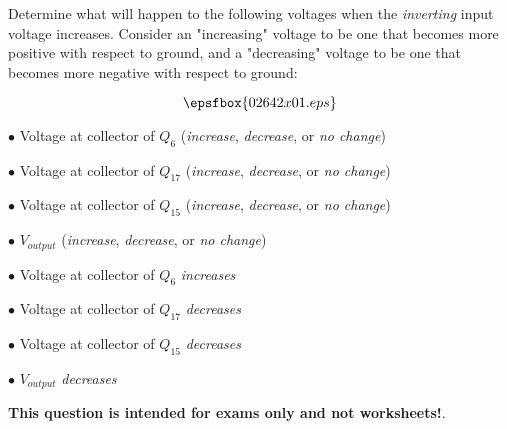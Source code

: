 

Determine what will happen to the following voltages when the {\it inverting} input voltage increases.  Consider an "increasing" voltage to be one that becomes more positive with respect to ground, and a "decreasing" voltage to be one that becomes more negative with respect to ground:

$$\epsfbox{02642x01.eps}$$

\medskip
\item{$\bullet$} Voltage at collector of $Q_6$ ({\it increase}, {\it decrease}, or {\it no change})
\item{$\bullet$} Voltage at collector of $Q_{17}$ ({\it increase}, {\it decrease}, or {\it no change})
\item{$\bullet$} Voltage at collector of $Q_{15}$ ({\it increase}, {\it decrease}, or {\it no change})
\item{$\bullet$} $V_{output}$ ({\it increase}, {\it decrease}, or {\it no change})
\medskip







\medskip
\goodbreak
\item{$\bullet$} Voltage at collector of $Q_6$ {\it increases}
\item{$\bullet$} Voltage at collector of $Q_{17}$ {\it decreases}
\item{$\bullet$} Voltage at collector of $Q_{15}$ {\it decreases}
\item{$\bullet$} $V_{output}$ {\it decreases}
\medskip







{\bf This question is intended for exams only and not worksheets!}.




